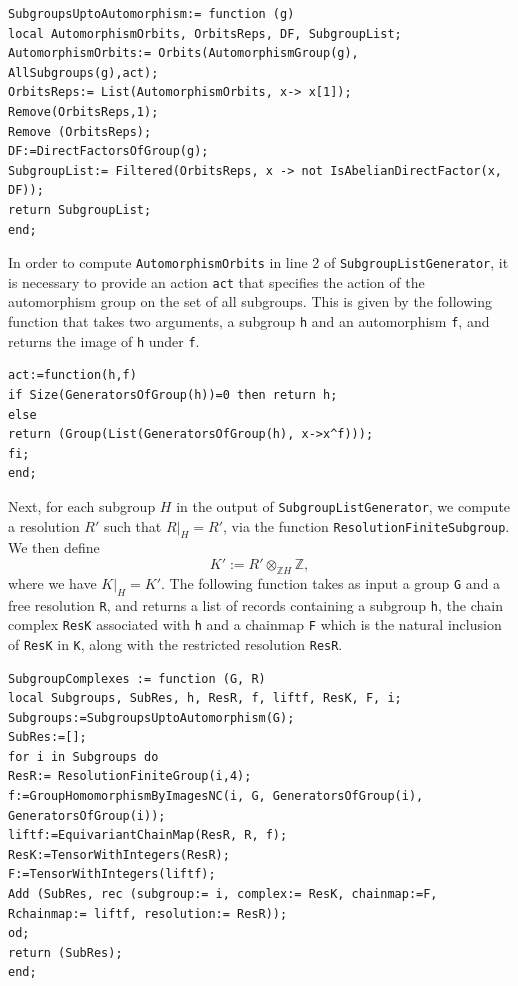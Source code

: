 \documentclass[11pt]{book}
\theoremstyle{Rem}
\theoremstyle{definition}
\numberwithin{equation}{section}
\newcommand\ZZ{\mathbb Z}
\begin{document}
\begin{lstlisting}
SubgroupsUptoAutomorphism:= function (g)
local AutomorphismOrbits, OrbitsReps, DF, SubgroupList;
AutomorphismOrbits:= Orbits(AutomorphismGroup(g), AllSubgroups(g),act);
OrbitsReps:= List(AutomorphismOrbits, x-> x[1]);
Remove(OrbitsReps,1); 
Remove (OrbitsReps);
DF:=DirectFactorsOfGroup(g);
SubgroupList:= Filtered(OrbitsReps, x -> not IsAbelianDirectFactor(x, DF));
return SubgroupList;
end;
\end{lstlisting}
In order to compute \lstinline{AutomorphismOrbits} in line 2 of \lstinline{SubgroupListGenerator}, it is necessary to provide an action \lstinline{act} that specifies the action of the automorphism group on the set of all subgroups. This is given by the following function that takes two arguments, a subgroup \lstinline{h} and an automorphism \lstinline{f}, and returns the image of \lstinline{h} under \lstinline{f}.
\begin{lstlisting}
act:=function(h,f) 
if Size(GeneratorsOfGroup(h))=0 then return h;
else
return (Group(List(GeneratorsOfGroup(h), x->x^f)));
fi;
end;

\end{lstlisting}
Next, for each subgroup $H$ in the output of \lstinline{SubgroupListGenerator}, we compute a resolution $R'$ such that $R|_H= R'$, via the function \lstinline{ResolutionFiniteSubgroup}. We then define \begin{equation}
	K':=R'\otimes_{\ZZ H} \ZZ,
\end{equation} where we have $K|_H = K'$. The following function takes as input a group \lstinline{G} and a free resolution \lstinline{R}, and returns a list of records containing a subgroup \lstinline{h}, the chain complex \lstinline{ResK} associated with \lstinline{h} and a chainmap \lstinline{F} which is the natural inclusion of \lstinline{ResK} in \lstinline{K}, along with the restricted resolution \lstinline{ResR}.
\begin{lstlisting}
SubgroupComplexes := function (G, R)
local Subgroups, SubRes, h, ResR, f, liftf, ResK, F, i;
Subgroups:=SubgroupsUptoAutomorphism(G);
SubRes:=[];
for i in Subgroups do
ResR:= ResolutionFiniteGroup(i,4);
f:=GroupHomomorphismByImagesNC(i, G, GeneratorsOfGroup(i), GeneratorsOfGroup(i));
liftf:=EquivariantChainMap(ResR, R, f);
ResK:=TensorWithIntegers(ResR);
F:=TensorWithIntegers(liftf);
Add (SubRes, rec (subgroup:= i, complex:= ResK, chainmap:=F, Rchainmap:= liftf, resolution:= ResR));
od;
return (SubRes);
end;
\end{lstlisting}
\end{document}
